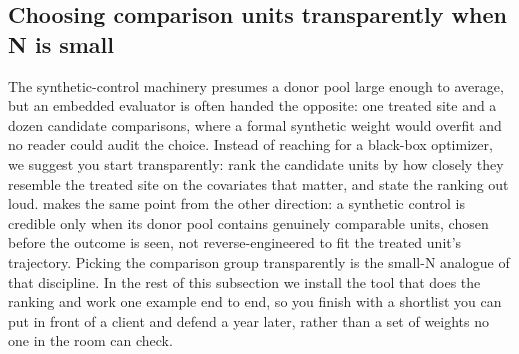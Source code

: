 \subsection{Choosing comparison units transparently when N is small}\label{ch08-sec:twins}
The synthetic-control machinery presumes a donor pool large enough to average, but an embedded evaluator is often handed the opposite: one treated site and a dozen candidate comparisons, where a formal synthetic weight would overfit and no reader could audit the choice. Instead of reaching for a black-box optimizer, we suggest you start transparently: rank the candidate units by how closely they resemble the treated site on the covariates that matter, and state the ranking out loud. \textcite{abadie2021synth} makes the same point from the other direction: a synthetic control is credible only when its donor pool contains genuinely comparable units, chosen before the outcome is seen, not reverse-engineered to fit the treated unit's trajectory. Picking the comparison group transparently is the small-N analogue of that discipline. In the rest of this subsection we install the tool that does the ranking and work one example end to end, so you finish with a shortlist you can put in front of a client and defend a year later, rather than a set of weights no one in the room can check.

